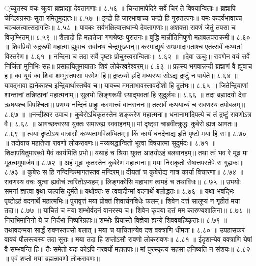्च्युतस्य वचः श्रुत्वा ब्रह्माद्या देवतागणाः॥ ८.५६ ॥
चिन्तामापेदिरे सर्वे चिरं ते विषयान्विताः॥
ब्रह्मापि चेन्द्रियग्रस्तः सुता रमितुमुद्यतः॥ ८.५७ ॥
इन्द्रो हि जारभावाच्च चन्द्रो हि गुरुतल्पगः॥
यमः कदर्यभावाच्च चञ्चलत्वात्सदागतिः॥ ८.५८ ॥
पावकः सर्वभक्षित्वात्तथान्ये देवतागणाः॥
अशक्ता रावणं जेतुं तपसा च विजृम्भितम्॥ ८.५९ ॥
शैलादो हि महातेजा गणश्रेष्ठः पुरातनः॥
बुद्धि मान्नीतिनिपुणो महाबलपराक्रमी॥ ८.६० ॥
शिवप्रियो रुद्ररूपी महात्मा ह्युवाच सर्वानथ चेन्द्रमुख्यान्॥
कस्माद्यूयं सम्भ्रमादागताश्च एतत्सर्वं कथ्यतां विस्तरेण॥ ८.६१ ॥
नन्दिना च तदा सर्वे पृष्टाः प्रोचुस्त्वरान्विताः॥ ८.६२ ॥
॥देवा ऊचुः॥
रावणेन वयं सर्वे निर्जिता मुनिभिः सह॥
प्रसादयितुमायाताः शिवं लोकेश्वरेश्वरम्॥ ८.६३ ॥
प्रहस्य भगवान्नन्दी ब्रह्माणं वै ह्युवाच ह॥
क्व यूयं क्व शिवः शम्भुस्तपसा परमेण हि॥
द्रष्टव्यो हृदि मध्यस्थः सोऽद्य द्रष्टुं न पार्यते॥ ८.६४ ॥
यावद्भावा ह्यनेकाश्च इन्द्रियार्थास्तथैव च॥
यावच्च ममताभावस्तावदीशो हि दुर्लभः॥ ८.६५ ॥
जितेन्द्रियाणां शान्तानां तन्निष्ठानां महात्मनाम्॥
सुलभो लिङ्गरूपी स्याद्भवतां हि सुदुर्लभः॥ ८.६६ ॥
तदा ब्रह्मादयो देवा ऋषयश्च विपश्चितः॥
प्रणम्य नन्दिनं प्राहुः कस्मात्त्वं वानराननः॥
तत्सर्वं कथयान्यं च रावणस्य तपोबलम्॥ ८.६७ ॥
॥नन्दीश्वर उवाच॥
कुबेरोऽधिकृतस्तेन शङ्करेण महात्मना॥
धनानामादिपत्ये च तं द्रष्टुं रावणोऽत्र वै॥ ८.६८ ॥
आगच्छत्त्वरया युक्तः समारुह्य स्ववाहनम्॥
मां दृष्ट्वा चाब्रवीत्क्रुद्धः कुबेरो ह्यत्र आगतः॥ ८.६९ ॥
त्वया दृष्टोऽथ वात्रासौ कथ्यतामविलम्बितम्॥
किं कार्यं धनदेनाद्य इति पृष्टो मया हि सः॥ ८.७० ॥
तदोवाच महातेजा रावणो लोकरावणः॥
मय्यश्रद्धान्वितो भूत्वा विषयात्मा सुदुर्मदः॥ ८.७१ ॥
शिक्षापयितुमारब्धो मैवं कार्यमिति प्रभो॥
यथाहं च श्रिया युक्त आढ्योऽहं बलवानहम्॥
तथा त्वं भव रे मूढ मा मूढत्वमुपार्जय॥ ८.७२ ॥
अहं मूढः कृतस्तेन कुबेरेण महात्मना॥
मया निराकृतो रोषात्तपस्तेपे स गुह्यकः॥ ८.७३ ॥
कुबेरः स हि नन्दिन्किमागतस्तव मन्दिरम्॥
दीयतां च कुबेरोद्य नात्र कार्या विचारणा॥ ८.७४ ॥
रावणस्य वचः श्रुत्वा ह्यवोचं त्वरितोऽप्यहम्॥
लिङ्गकोसि महाभाग त्वमहं च तथाविधः॥ ८.७५ ॥
उभयोः समनां ज्ञात्वा वृथा जल्पसि दुर्मते॥
यथोक्तः स त्ववादीन्मां वदनार्थे बलोद्धतः॥ ८.७६ ॥
यथा भवद्भिः पृष्टोऽहं वदनार्थे महात्मभिः॥
पुरावृत्तं मया प्रोक्तं शिवार्चनविधेः फलम्॥
शिवेन दत्तं सालूप्यं न गृहीतं मया तदा॥ ८.७७ ॥
याचितं च मया शम्भोर्वदनं वानरस्य च॥
शिवेन कृपया दत्तं मम कारुण्यशालिना॥ ८.७८ ॥
निराभिमानिनो ये च निर्दभा निष्परिग्रहाः॥
शम्भोः प्रियास्ते विज्ञेया ह्यन्ये शिववबहिष्कृताः॥ ८.७९ ॥
तथावदन्मया सार्द्धं रावणस्तपसो बलात्॥
मया च याचितान्येव दश वक्त्राणि धीमता॥ ८.८० ॥
उपहासकरं वाक्यं पौलस्त्यस्य तदा सुराः॥
मया तदा हि शप्तोऽसौ रावणो लोकरावणः॥ ८.८१ ॥
ईदृशान्येव वक्त्राणि येषां वै सम्भवन्ति हि॥
तैः समेतो यदा कोऽपि नरवर्यो महातपाः॥
मां पुरस्कृत्य सहसा हनिष्यति न संशयः॥ ८.८२ ॥
एवं शप्तो मया ब्रह्मन्रावणो लोकरावणः॥
